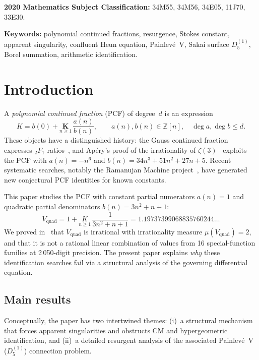 \documentclass[11pt,a4paper]{article}
\theoremstyle{definition}
\theoremstyle{remark}
\newcommand{\Vq}{V_{\mathrm{quad}}}
\newcommand{\Z}{\mathbb{Z}}
\begin{document}
\noindent
\textbf{2020 Mathematics Subject Classification:}
34M55, 34M56, 34E05, 11J70, 33E30.

\noindent
\textbf{Keywords:}
polynomial continued fractions,
resurgence, Stokes constant,
apparent singularity, confluent Heun equation,
Painlev\'e~V, Sakai surface $D_5^{(1)}$,
Borel summation,
arithmetic identification.


\section{Introduction}\label{sec:intro}

A \emph{polynomial continued fraction} (PCF)
of degree~$d$ is an expression
\[
  K = b(0) + \underset{n \ge 1}{\mathbf{K}}\,
  \frac{a(n)}{b(n)},
  \qquad a(n), b(n) \in \Z[n],
  \quad \deg a, \deg b \leq d.
\]
These objects have a distinguished history: the
Gauss continued fraction expresses ${}_2F_1$
ratios~\cite{lorentzen2008}, and Ap\'ery's
proof of the irrationality of
$\zeta(3)$~\cite{apery1979} exploits the PCF
with $a(n) = -n^6$ and
$b(n) = 34n^3 + 51n^2 + 27n + 5$.
Recent systematic searches, notably the
Ramanujan Machine project~\cite{raayoni2021},
have generated new conjectural PCF identities
for known constants.

This paper studies the PCF with constant
partial numerators $a(n)=1$ and quadratic
partial denominators $b(n)=3n^2+n+1$:
\begin{equation}\label{eq:vquad-def}
  \Vq = 1 + \underset{n \ge 1}{K}\,
  \frac{1}{3n^2+n+1}
  = 1.19737399068835760244\ldots
\end{equation}
We proved in~\cite{vquad-exclusion} that $\Vq$
is irrational with irrationality measure
$\mu(\Vq)=2$, and that it is not a rational
linear combination of values from 16
special-function families at 2\,050-digit
precision. The present paper explains
\emph{why} these identification searches fail
via a structural analysis of the governing
differential equation.

\subsection{Main results}

Conceptually, the paper has two intertwined
themes: (i)~a structural mechanism that forces
apparent singularities and obstructs CM and
hypergeometric identification, and (ii)~a
detailed resurgent analysis of the associated
Painlev\'e~V ($D_5^{(1)}$) connection problem.
\end{document}
